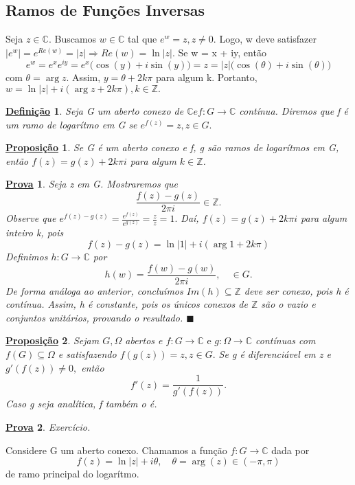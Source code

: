 \documentclass{article}
\newtheorem*{def*}{\underline{Defini\c c\~ao}}
\newtheorem*{proof*}{\underline{Prova}}
\newtheorem*{prop*}{\underline{Proposi\c c\~ao}}
\renewcommand\qedsymbol{$\blacksquare$}
\begin{document}
\subsection{Ramos de Fun\c c\~oes Inversas}
  Seja $z\in \mathbb{C}.$ Buscamos $w\in \mathbb{C}$ tal que $e^{w} = z, z\neq0.$ Logo, w deve satisfazer $|e^{w}|
= e^{Re(w)} = |z|\Rightarrow Re(w) = \ln{|z|}.$ Se w = x + iy, ent\~ao
  $$
  e^{w} = e^{x}e^{iy} = e^{x}\biggl(\cos{(y)} + i\sin{(y)}\biggr) = z = |z|\biggl(\cos{(\theta)} + i\sin{(\theta)}\biggr)
  $$
  com $\theta = \arg{z}.$ Assim, $y = \theta + 2k\pi$ para algum k. Portanto, $w = \ln{|z|} + i(\arg{z} + 2k\pi), k\in \mathbb{Z}.$
 \begin{def*}
   Seja G um aberto conexo de $\mathbb{C} e f:G\rightarrow \mathbb{C}$ cont\'inua. Diremos que f \'e um ramo de logar\'itmo
  em G se $e^{f(z)} = z, z\in{G}.$
 \end{def*}
\begin{prop*}
  Se G \'e um aberto conexo e f, g s\~ao ramos de logar\'itmos em G, ent\~ao $f(z) = g(z) + 2k\pi i$ para algum
$k\in \mathbb{Z}$.
\end{prop*}
\begin{proof*}
  Seja z em G. Mostraremos que 
  $$
    \frac{f(z) - g(z)}{2\pi i}\in \mathbb{Z}.
  $$
  Observe que $e^{f(z) - g(z)} = \frac{e^{f(z)}}{e^{g(z)}} = \frac{z}{z} = 1.$ Da\'i, $f(z) = g(z) + 2k\pi i$ para algum
inteiro k, pois
  $$
  f(z) - g(z) = \ln{|1|} + i(\arg{1} + 2k\pi)
  $$
Definimos $h:G\rightarrow \mathbb{C}$ por 
  $$
  h(w) = \frac{f(w) - g(w)}{2 \pi i}, \quad \in{G}.
  $$
  De forma an\'aloga ao anterior, conclu\'imos $Im(h)\subseteq{\mathbb{Z}}$ deve ser conexo, pois h \'e cont\'inua. Assim,
h \'e constante, pois os \'unicos conexos de $\mathbb{Z}$ s\~ao o vazio e conjuntos unit\'arios, provando o resultado. \qedsymbol
\end{proof*}
\begin{prop*}
  Sejam $G, \Omega$ abertos e $f:G\rightarrow \mathbb{C}\text{ e }g:\Omega\rightarrow \mathbb{C}$ cont\'inuas com $f(G)\subseteq{\Omega}$
e satisfazendo $f(g(z)) = z, z\in{G}.$ Se g \'e diferenci\'avel em z e $g'(f(z))\neq0,$ ent\~ao
  $$
    f'(z) = \frac{1}{g'(f(z))}.
  $$
Caso g seja anal\'itica, f tamb\'em o \'e.
\end{prop*}
\begin{proof*}
  Exerc\'icio.
\end{proof*}
  Considere G um aberto conexo. Chamamos a fun\c c\~ao $f:G\rightarrow \mathbb{C} $ dada por 
  $$
  f(z) = \ln{|z|} + i \theta, \quad \theta=\arg{(z)}\in{(-\pi, \pi)}
  $$
de ramo principal do logar\'itmo.
\newpage
\end{document}
